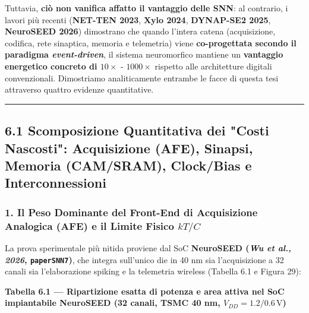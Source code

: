 \documentclass[11pt,a4paper]{article}
\begin{document}
Tuttavia, \textbf{ciò non vanifica affatto il vantaggio delle SNN}: al contrario, i lavori più recenti (\textbf{NET-TEN 2023}, \textbf{Xylo 2024}, \textbf{DYNAP-SE2 2025}, \textbf{NeuroSEED 2026}) dimostrano che quando l'intera catena (acquisizione, codifica, rete sinaptica, memoria e telemetria) viene \textbf{co-progettata secondo il paradigma \textit{event-driven}}, il sistema neuromorfico mantiene un \textbf{vantaggio energetico concreto di $10\times \text{ - } 1000\times$} rispetto alle architetture digitali convenzionali. Dimostriamo analiticamente entrambe le facce di questa tesi attraverso quattro evidenze quantitative.

\bigskip\hrule\bigskip

\subsection{6.1 Scomposizione Quantitativa dei "Costi Nascosti": Acquisizione (AFE), Sinapsi, Memoria (CAM/SRAM), Clock/Bias e Interconnessioni}

\subsubsection{1. Il Peso Dominante del Front-End di Acquisizione Analogica (AFE) e il Limite Fisico $kT/C$}
La prova sperimentale più nitida proviene dal SoC \textbf{NeuroSEED (\textit{Wu et al., 2026}, \texttt{paperSNN7})}, che integra sull'unico die in 40 nm sia l'acquisizione a 32 canali sia l'elaborazione spiking e la telemetria wireless (Tabella 6.1 e Figura 29):

\textbf{Tabella 6.1 --- Ripartizione esatta di potenza e area attiva nel SoC impiantabile NeuroSEED (32 canali, TSMC 40 nm, $V_{DD}=1.2/0.6\,\text{V}$)}
\end{document}
